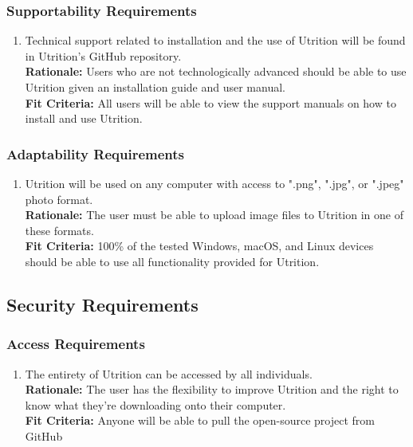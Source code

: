\documentclass[12pt]{article}
\begin{document}
\subsubsection{Supportability Requirements}
\begin{enumerate}[{MS}2. ] 
	\item Technical support related to installation and the use of Utrition will be found in Utrition’s GitHub repository. \\
	\textbf{Rationale:} Users who are not technologically advanced should be able to use Utrition given an installation guide and user manual.\\	
	\textbf{Fit Criteria:} All users will be able to view the support manuals on how to install and use Utrition.
\end{enumerate}

\subsubsection{Adaptability Requirements}
\begin{enumerate}[{MS}3. ] 
	\item Utrition will be used on any computer with access to ".png", ".jpg", or ".jpeg" photo format.\\
	\textbf{Rationale:} The user must be able to upload image files to Utrition in one of these formats. \\
	\textbf{Fit Criteria:} 100\% of the tested Windows, macOS, and Linux devices should be able to use all functionality provided for Utrition.
\end{enumerate}


\subsection{Security Requirements}

\subsubsection{Access Requirements}
\begin{enumerate}[{SR}1. ] 
	\item The entirety of Utrition can be accessed by all individuals. \\
	\textbf{Rationale:} The user has the flexibility to improve Utrition and the right to know what they’re downloading onto their computer.  \\	
	\textbf{Fit Criteria:} Anyone will be able to pull the open-source project from GitHub
\end{enumerate}
\end{document}
